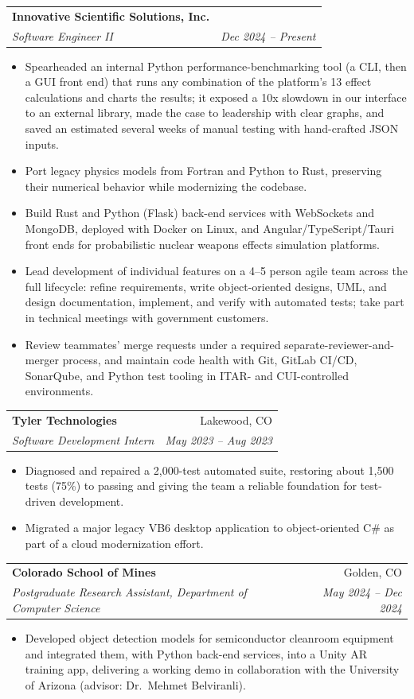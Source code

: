 \documentclass[letterpaper,10pt]{article}
\makeatletter
\newcommand{\entry}[4]{%
  \begin{tabularx}{\linewidth}{@{}X r@{}}
    \textbf{#1} & #2 \\
    \textit{#3} & \textit{\small #4} \\
  \end{tabularx}\vspace{-2pt}%
}
\makeatother
\begin{document}
\entry{Innovative Scientific Solutions, Inc.}{}{Software Engineer II}{Dec 2024 -- Present}
\begin{itemize}
  \item Spearheaded an internal Python performance-benchmarking tool (a CLI, then a GUI front end) that runs any
        combination of the platform's 13 effect calculations and charts the results; it exposed a 10x slowdown in our
        interface to an external library, made the case to leadership with clear graphs, and saved an estimated
        several weeks of manual testing with hand-crafted JSON inputs.
  \item Port legacy physics models from Fortran and Python to Rust, preserving their numerical behavior while
        modernizing the codebase.
  \item Build Rust and Python (Flask) back-end services with WebSockets and MongoDB, deployed with Docker on Linux,
        and Angular/TypeScript/Tauri front ends for probabilistic nuclear weapons effects simulation platforms.
  \item Lead development of individual features on a 4--5 person agile team across the full lifecycle: refine
        requirements, write object-oriented designs, UML, and design documentation, implement, and verify with
        automated tests; take part in technical meetings with government customers.
  \item Review teammates' merge requests under a required separate-reviewer-and-merger process, and maintain code
        health with Git, GitLab CI/CD, SonarQube, and Python test tooling in ITAR- and CUI-controlled environments.
\end{itemize}

\entry{Tyler Technologies}{Lakewood, CO}{Software Development Intern}{May 2023 -- Aug 2023}
\begin{itemize}
  \item Diagnosed and repaired a 2,000-test automated suite, restoring about 1,500 tests (75\%) to passing and giving
        the team a reliable foundation for test-driven development.
  \item Migrated a major legacy VB6 desktop application to object-oriented C\# as part of a cloud modernization effort.
\end{itemize}

\entry{Colorado School of Mines}{Golden, CO}{Postgraduate Research Assistant, Department of Computer Science}{May 2024 -- Dec 2024}
\begin{itemize}
  \item Developed object detection models for semiconductor cleanroom equipment and integrated them, with Python
        back-end services, into a Unity AR training app, delivering a working demo in collaboration with the
        University of Arizona (advisor: Dr.\ Mehmet Belviranli).
\end{itemize}
\end{document}
